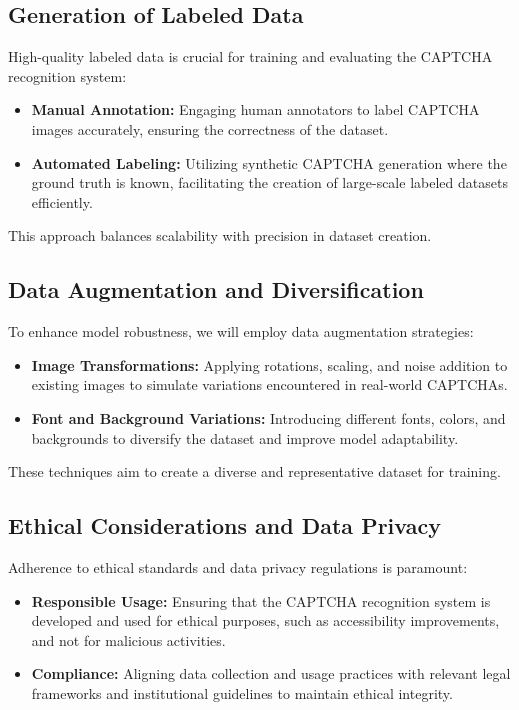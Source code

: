\documentclass[sigconf]{acmart}
\begin{document}
\subsection{Generation of Labeled Data}

High-quality labeled data is crucial for training and evaluating the CAPTCHA recognition system:

\begin{itemize} \item \textbf{Manual Annotation:} Engaging human annotators to label CAPTCHA images accurately, ensuring the correctness of the dataset. \item \textbf{Automated Labeling:} Utilizing synthetic CAPTCHA generation where the ground truth is known, facilitating the creation of large-scale labeled datasets efficiently. \end{itemize}

This approach balances scalability with precision in dataset creation.

\subsection{Data Augmentation and Diversification}

To enhance model robustness, we will employ data augmentation strategies:

\begin{itemize} \item \textbf{Image Transformations:} Applying rotations, scaling, and noise addition to existing images to simulate variations encountered in real-world CAPTCHAs. \item \textbf{Font and Background Variations:} Introducing different fonts, colors, and backgrounds to diversify the dataset and improve model adaptability. \end{itemize}

These techniques aim to create a diverse and representative dataset for training.

\subsection{Ethical Considerations and Data Privacy}

Adherence to ethical standards and data privacy regulations is paramount:

\begin{itemize} \item \textbf{Responsible Usage:} Ensuring that the CAPTCHA recognition system is developed and used for ethical purposes, such as accessibility improvements, and not for malicious activities. \item \textbf{Compliance:} Aligning data collection and usage practices with relevant legal frameworks and institutional guidelines to maintain ethical integrity. \end{itemize}
\end{document}
